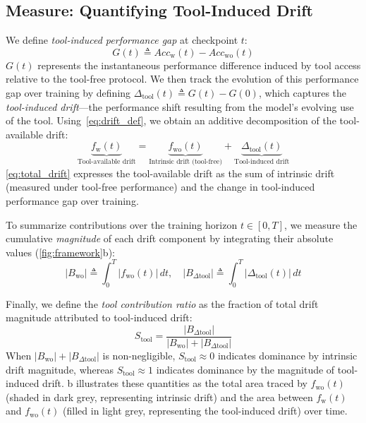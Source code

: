 \subsection{Measure: Quantifying Tool-Induced Drift}

We define \textit{tool-induced performance gap} at checkpoint $t$:
%
\begin{equation}
    G(t) \triangleq Acc_{\mathrm{w}}(t) - Acc_{\mathrm{wo}}(t)
\end{equation}
%
$G(t)$ represents the instantaneous performance difference induced by tool access relative to the tool-free protocol.
%
We then track the evolution of this performance gap over training by defining \( \Delta_{\mathrm{tool}}(t) \triangleq G(t) - G(0) \), which captures the \textit{tool-induced drift}—the performance shift resulting from the model’s evolving use of the tool.
%
Using~\cref{eq:drift_def}, we obtain an additive decomposition of the tool-available drift:
%
\begin{equation}
    \underbrace{f_{\mathrm{w}}(t)}_{\text{Tool-available drift}}
    =
    \underbrace{f_{\mathrm{wo}}(t)}_{\text{Intrinsic drift (tool-free)}}
    +
    \underbrace{\Delta_{\mathrm{tool}}(t)}_{\text{Tool-induced  drift}}
    \label{eq:total_drift}
\end{equation}
%
\cref{eq:total_drift} expresses the tool-available drift as the sum of intrinsic drift (measured under tool-free performance) and the change in tool-induced performance gap over training.

To summarize contributions over the training horizon $t\in[0,T]$, we measure the cumulative \textit{magnitude} of each drift component by integrating their absolute values (\cref{fig:framework}b):
\begin{equation}
    |B_{\mathrm{wo}}| \triangleq \int_{0}^{T} \big| f_{\mathrm{wo}}(t) \big|\,dt,
    \quad
    |B_{\Delta \mathrm{tool}}| \triangleq \int_{0}^{T} \big| \Delta_{\mathrm{tool}}(t) \big|\,dt
\end{equation}

Finally, we define the \textit{tool contribution ratio} as the fraction of total drift magnitude attributed to tool-induced drift:
%
\begin{equation}
    S_{\mathrm{tool}} = \frac{|B_{\Delta \mathrm{tool}}|}{|B_{\mathrm{wo}}| + |B_{\Delta \mathrm{tool}}|}
\end{equation}
%
When $|B_{\mathrm{wo}}| + |B_{\Delta \mathrm{tool}}|$ is non-negligible, $S_{\mathrm{tool}}\approx 0$ indicates dominance by intrinsic drift magnitude,
whereas $S_{\mathrm{tool}}\approx 1$ indicates dominance by the magnitude of tool-induced drift.
%
b illustrates these quantities as the total area traced by \( f_{\mathrm{wo}}(t) \) (shaded in dark grey, representing intrinsic drift) and the area between \( f_{\mathrm{w}}(t) \) and \( f_{\mathrm{wo}}(t) \) (filled in light grey, representing the tool-induced drift) over time.

